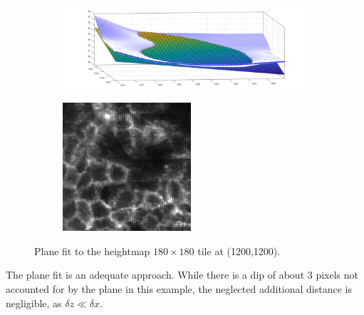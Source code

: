 \documentclass[10pt,a4paper]{article}
\begin{document}
\begin{figure}
\begin{subfigure}{.65\textwidth}
\includegraphics[width=\textwidth]{plane_smooth5.png}
\end{subfigure}
\begin{subfigure}{.25\textwidth}
\includegraphics[width=\textwidth]{focused_Exp186_0435_tile1200-1200.png}
\end{subfigure}
\caption{Plane fit to the heightmap $180\times180$ tile at (1200,1200).}
\end{figure}
The plane fit is an adequate approach.  While there is a dip of about $3$ pixels not accounted for by the plane in this example, the neglected additional distance is negligible, as $\delta z \ll \delta x$.
\end{document}
